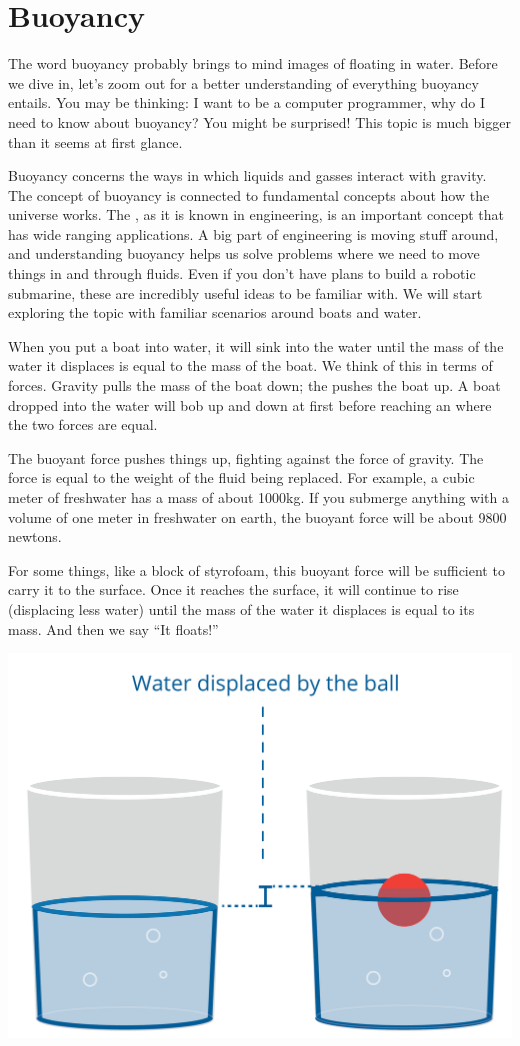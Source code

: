 \chapter{Buoyancy}

The word buoyancy probably brings to mind images of floating in water. Before we dive in, let's zoom out for a better understanding of everything buoyancy entails. You may be thinking: I want to be a computer programmer, why do I need to know about buoyancy? You might be surprised! This topic is much bigger than it seems at first glance. 

Buoyancy concerns the ways in which liquids and gasses interact with gravity. The concept of buoyancy is connected to fundamental concepts about how the universe works. The , as it is known in engineering, is an important concept that has wide ranging applications. A big part of engineering is moving stuff around, and understanding buoyancy helps us solve problems where we need to move things in and through fluids. Even if you don't have plans to build a robotic submarine, these are incredibly useful ideas to be familiar with. We will start exploring the topic with familiar scenarios around boats and water.

When you put a boat into water, it will sink into the water until
the mass of the water it displaces is equal to the mass of the
boat. We think of this in terms of forces. Gravity pulls the mass of
the boat down; the  pushes the boat up. A boat
dropped into the water will bob up and down at first before reaching an
 where the two forces are equal.

The buoyant force pushes things up, fighting against the force of
gravity. The force is equal to the weight of the fluid being
replaced. For example, a cubic meter of freshwater has a mass of
about 1000kg. If you submerge anything with a volume of one meter in
freshwater on earth, the buoyant force will be about 9800 newtons.

For some things, like a block of styrofoam, this buoyant force will be
sufficient to carry it to the surface. Once it reaches the surface, it
will continue to rise (displacing less water) until the mass of the
water it displaces is equal to its mass. And then we say ``It floats!''

\includegraphics[width=.6\textwidth]{waterDisplacement.png}

